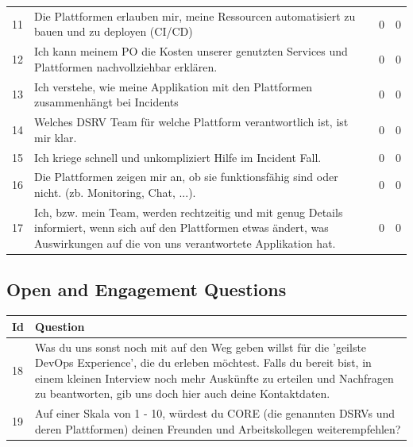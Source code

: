 \documentclass[a4paper,12pt]{article}
\begin{document}
\begin{table}[!htbp]
\begin{center}
\begin{tabularx}{\textwidth}{lXll}
                11 & Die Plattformen erlauben mir, meine Ressourcen automatisiert zu bauen und zu deployen (CI/CD) & 0 & 0  \\
                12 & Ich kann meinem PO die Kosten unserer genutzten Services und Plattformen nachvollziehbar erklären. & 0 & 0  \\
                13 & Ich verstehe, wie meine Applikation mit den Plattformen zusammenhängt bei Incidents & 0 & 0  \\
                14 & Welches DSRV Team für welche Plattform verantwortlich ist, ist mir klar.                                                                                                              & 0    & 0  \\
                15 & Ich kriege schnell und unkompliziert Hilfe im Incident Fall.                                                                                                                          & 0    & 0  \\
                16 & Die Plattformen zeigen mir an, ob sie funktionsfähig sind oder nicht. (zb. Monitoring, Chat, ...). & 0 & 0  \\
                17 & Ich, bzw. mein Team, werden rechtzeitig und mit genug Details informiert, wenn sich auf den Plattformen etwas ändert, was Auswirkungen auf die von uns verantwortete Applikation hat. & 0 & 0  \\
                \bottomrule
            \end{tabularx}
        \end{center}
    \end{table}
    \subsection{Open and Engagement Questions}
    \label{subsubsec:openandengagement}
    \begin{table}[!htbp]
        \begin{center}
            \begin{tabularx}{\textwidth}{lX}
                \toprule
                Id & Question                                                                                                                                                                             \\
                \midrule
                18  & Was du uns sonst noch mit auf den Weg geben willst für die 'geilste DevOps Experience', die du erleben möchtest. Falls du bereit bist, in einem kleinen Interview noch mehr Auskünfte zu erteilen und Nachfragen zu beantworten, gib uns doch hier auch deine Kontaktdaten.        \\
                19  & Auf einer Skala von 1 - 10, würdest du CORE (die genannten DSRVs und deren Plattformen) deinen Freunden und Arbeitskollegen weiterempfehlen?  \\
                \bottomrule
            \end{tabularx}
        \end{center}
    \end{table}
\end{document}
